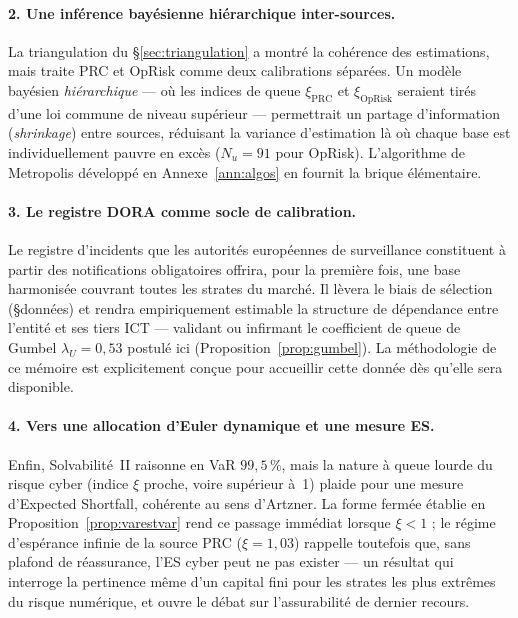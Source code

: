 \documentclass[11pt,a4paper]{article}
\theoremstyle{navystyle}
\theoremstyle{navydef}
\begin{document}
\paragraph{2. Une inférence bayésienne hiérarchique inter-sources.} La triangulation du §\ref{sec:triangulation} a montré la cohérence des estimations, mais traite PRC et OpRisk comme deux calibrations séparées. Un modèle bayésien \emph{hiérarchique} --- où les indices de queue $\xi_{\text{PRC}}$ et $\xi_{\text{OpRisk}}$ seraient tirés d'une loi commune de niveau supérieur --- permettrait un partage d'information (\emph{shrinkage}) entre sources, réduisant la variance d'estimation là où chaque base est individuellement pauvre en excès ($N_u=91$ pour OpRisk). L'algorithme de Metropolis développé en Annexe~\ref{ann:algos} en fournit la brique élémentaire.

\paragraph{3. Le registre DORA comme socle de calibration.} Le registre d'incidents que les autorités européennes de surveillance constituent à partir des notifications obligatoires offrira, pour la première fois, une base harmonisée couvrant toutes les strates du marché. Il lèvera le biais de sélection (§données) et rendra empiriquement estimable la structure de dépendance entre l'entité et ses tiers ICT --- validant ou infirmant le coefficient de queue de Gumbel $\lambda_U=0{,}53$ postulé ici (Proposition~\ref{prop:gumbel}). La méthodologie de ce mémoire est explicitement conçue pour accueillir cette donnée dès qu'elle sera disponible.

\paragraph{4. Vers une allocation d'Euler dynamique et une mesure ES.} Enfin, Solvabilité~II raisonne en VaR $99{,}5\,\%$, mais la nature à queue lourde du risque cyber (indice $\xi$ proche, voire supérieur à~1) plaide pour une mesure d'Expected Shortfall, cohérente au sens d'Artzner. La forme fermée établie en Proposition~\ref{prop:varestvar} rend ce passage immédiat lorsque $\xi<1$ ; le régime d'espérance infinie de la source PRC ($\xi=1{,}03$) rappelle toutefois que, sans plafond de réassurance, l'ES cyber peut ne pas exister --- un résultat qui interroge la pertinence même d'un capital fini pour les strates les plus extrêmes du risque numérique, et ouvre le débat sur l'assurabilité de dernier recours.
\end{document}
